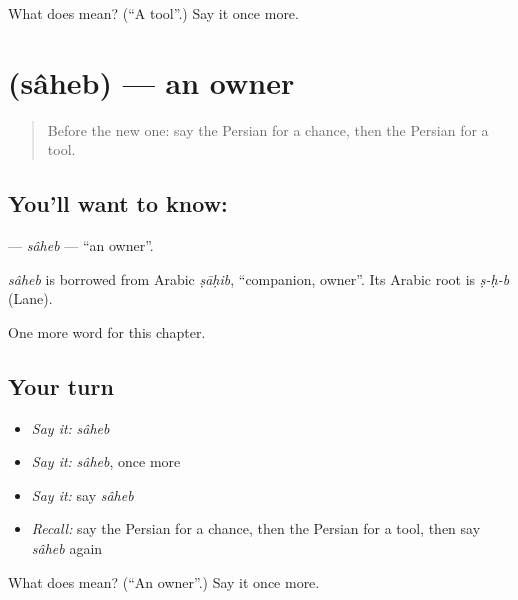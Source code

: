 \begin{tcolorbox}[breakable,colback=teal!4,colframe=teal!35!black,title={Before you move on}]
What does  mean? (\textquotedblleft{}A tool\textquotedblright{}.) Say it once more.
\end{tcolorbox}
\section[\texorpdfstring{\fa{صاحب} (sâheb)}{صاحب (sâheb)}]{ (sâheb) — an owner}

\label{lesson:FA-C90-saheb}



\begin{quote}
Before the new one: say the Persian for a chance, then the Persian for a tool.
\end{quote}

\subsection*{You'll want to know: }
\textbf{} — \emph{sâheb} — \textquotedblleft{}an owner\textquotedblright{}.

\begin{cousinweb}
\emph{sâheb} is borrowed from Arabic \emph{ṣāḥib}, \textquotedblleft{}companion, owner\textquotedblright{}. Its Arabic root is \emph{ṣ-ḥ-b} (Lane).
\end{cousinweb}

\begin{grammarlens}[title={What you've built}]
One more word for this chapter.
\end{grammarlens}

\subsection*{Your turn}
\begin{itemize}
\raggedright
  \item \emph{Say it:} \emph{sâheb}
  \item \emph{Say it:} \emph{sâheb}, once more
  \item \emph{Say it:} say \emph{sâheb}
  \item \emph{Recall:} say the Persian for a chance, then the Persian for a tool, then say \emph{sâheb} again
\end{itemize}

\begin{tcolorbox}[breakable,colback=teal!4,colframe=teal!35!black,title={Before you move on}]
What does  mean? (\textquotedblleft{}An owner\textquotedblright{}.) Say it once more.
\end{tcolorbox}
